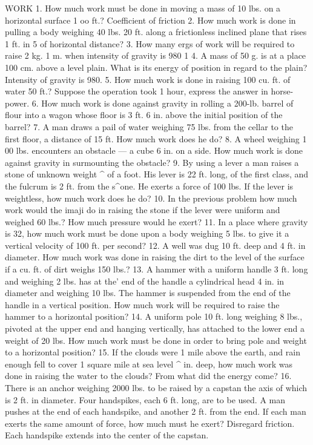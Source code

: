 WORK
1. How much work must be done in moving a mass of 10 lbs. on a horizontal surface 1 oo ft.? Coefficient of friction
2. How much work is done in pulling a body weighing 40 lbs. 20 ft. along a frictionless inclined plane that rises 1 ft. in 5 of horizontal distance?
3. How many ergs of work will be required to raise 2 kg. 1 m. when intensity of gravity is 980 1
4. A mass of 50 g. is at a place 100 cm. above a level plain. What is its energy of position in regard to the plain? Intensity of gravity is 980.
5. How much work is done in raising 100 cu. ft. of water 50 ft.? Suppose the operation took 1 hour, express the answer in horse-power.
6. How much work is done against gravity in rolling a 200-lb. barrel of flour into a wagon whose floor is 3 ft. 6 in. above the initial position of the barrel?
7. A man draws a pail of water weighing 75 lbs. from the cellar to the first floor, a distance of 15 ft. How much work does he do?
8. A wheel weighing 1 00 lbs. encounters an obstacle — a cube 6 in. on a side. How much work is done against gravity in surmounting the obstacle?
9. By using a lever a man raises a stone of unknown weight ^ of a foot. His lever is 22 ft. long, of the first class, and the fulcrum is 2 ft. from the s^one. He exerts a force of 100 lbs. If the lever is weightless, how much work does he do?
10. In the previous problem how much work would the imaji do in raising the stone if the lever were uniform and weighed 60 lbs.? How much pressure would he exert?
11. In a place where gravity is 32, how much work must be done upon a body weighing 5 lbs. to give it a vertical velocity of 100 ft. per second?
12. A well was dug 10 ft. deep and 4 ft. in diameter. How much work was done in raising the dirt to the level of the surface if a cu. ft. of dirt weighs 150 lbs.?
13. A hammer with a uniform handle 3 ft. long and weighing 2 lbs. has at the' end of the handle a cylindrical head 4 in. in diameter and weighing 10 lbs. The hammer is suspended from the end of the handle in a vertical position. How much work will be required to raise the hammer to a horizontal position?
14. A uniform pole 10 ft. long weighing 8 lbs., pivoted at the upper end and hanging vertically, has attached to the lower end a weight of 20 lbs. How much work must be done in order to bring pole and weight to a horizontal position?
15. If the clouds were 1 mile above the earth, and rain enough fell to cover 1 square mile at sea level ^ in. deep, how much work was done in raising the water to the clouds? From what did the energy come?
16. There is an anchor weighing 2000 lbs. to be raised by a capstan the axis of which is 2 ft. in diameter. Four handspikes, each 6 ft. long, are to be used. A man pushes at the end of each handspike, and another 2 ft. from the end. If each man exerts the same amount of force, how much must he exert? Disregard friction. Each handspike extends into the center of the capstan.
